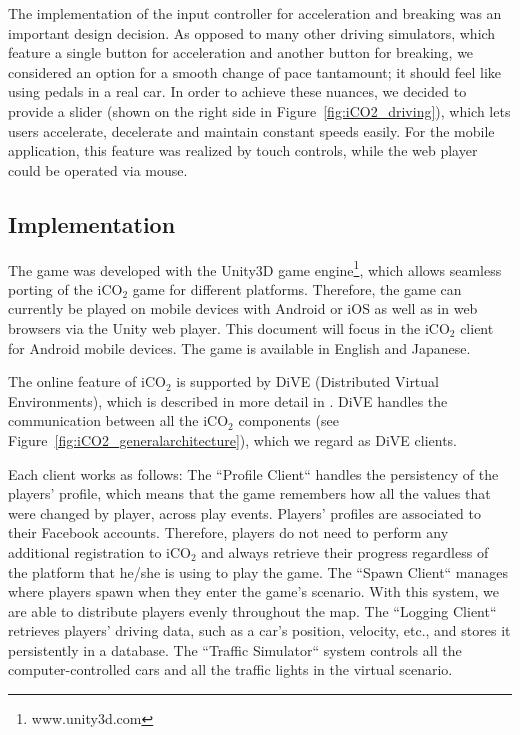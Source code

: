 \documentclass[preprint,authoryear,12pt]{elsarticle}
\begin{document}
The implementation of the input controller for acceleration and breaking was an important design decision. As opposed to many other driving simulators, which feature a single button for acceleration and another button for breaking, we considered an option for a smooth change of pace tantamount; it should feel like using pedals in a real car. In order to achieve these nuances, we decided to provide a slider (shown on the right side in Figure~\ref{fig:iCO2_driving}), which lets users accelerate, decelerate and maintain constant speeds easily. For the mobile application, this feature was realized by touch controls, while the web player could be operated via mouse.

\subsection{Implementation}


The game was developed with the Unity3D game engine\footnote{www.unity3d.com}, which allows seamless porting of the iCO$_2$ game for different platforms. Therefore, the game can currently be played on mobile devices with Android or iOS as well as in web browsers via the Unity web player. This document will focus in the iCO$_2$ client for Android mobile devices. The game is available in English and Japanese.

The online feature of iCO$_2$ is supported by DiVE (Distributed Virtual Environments), which is described in more detail in \cite{prendingeroliveira2014}. DiVE handles the communication between all the iCO$_2$ components (see Figure~\ref{fig:iCO2_generalarchitecture}), which we regard as DiVE clients. 

Each client works as follows: The ``Profile Client`` handles the persistency of the players' profile, which means that the game remembers how all the values that were changed by player, across play events. Players' profiles are associated to their Facebook accounts. Therefore, players do not need to perform any additional registration to iCO$_2$ and always retrieve their progress regardless of the platform that he/she is using to play the game. The ``Spawn Client`` manages where players spawn when they enter the game's scenario. With this system, we are able to distribute players evenly throughout the map. The ``Logging Client`` retrieves players' driving data, such as a car's position, velocity, etc., and stores it persistently in a database. The ``Traffic Simulator`` system controls all the computer-controlled cars and all the traffic lights in the virtual scenario.
\end{document}
